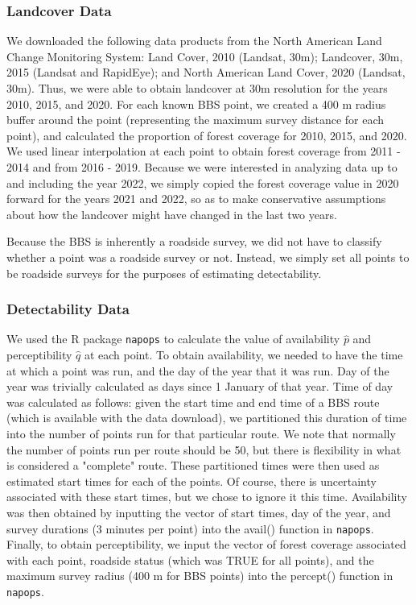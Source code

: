 \documentclass[12pt]{article}
\begin{document}
\subsubsection{Landcover Data}

\par We downloaded the following data products from the North American Land Change Monitoring System: Land Cover, 2010 (Landsat, 30m); Landcover, 30m, 2015 (Landsat and RapidEye); and North American Land Cover, 2020 (Landsat, 30m).
Thus, we were able to obtain landcover at 30m resolution for the years 2010, 2015, and 2020. 
For each known BBS point, we created a 400 m radius buffer around the point (representing the maximum survey distance for each point), and calculated the proportion of forest coverage for 2010, 2015, and 2020. 
We used linear interpolation at each point to obtain forest coverage from 2011 - 2014 and from 2016 - 2019. 
Because we were interested in analyzing data up to and including the year 2022, we simply copied the forest coverage value in 2020 forward for the years 2021 and 2022, so as to make conservative assumptions about how the landcover might have changed in the last two years.

\par Because the BBS is inherently a roadside survey, we did not have to classify whether a point was a roadside survey or not.
Instead, we simply set all points to be roadside surveys for the purposes of estimating detectability.

\subsubsection{Detectability Data}

\par We used the R package \texttt{napops} to calculate the value of availability $\hat{p}$ and perceptibility $\hat{q}$ at each point.
To obtain availability, we needed to have the time at which a point was run, and the day of the year that it was run.
Day of the year was trivially calculated as days since 1 January of that year.
Time of day was calculated as follows: given the start time and end time of a BBS route (which is available with the data download), we partitioned this duration of time into the number of points run for that particular route.
We note that normally the number of points run per route should be 50, but there is flexibility in what is considered a "complete" route.
These partitioned times were then used as estimated start times for each of the points. 
Of course, there is uncertainty associated with these start times, but we chose to ignore it this time.
Availability was then obtained by inputting the vector of start times, day of the year, and survey durations (3 minutes per point) into the avail() function in \texttt{napops}.
Finally, to obtain perceptibility, we input the vector of forest coverage associated with each point, roadside status (which was TRUE for all points), and the maximum survey radius (400 m for BBS points) into the percept() function in \texttt{napops}.
\end{document}
